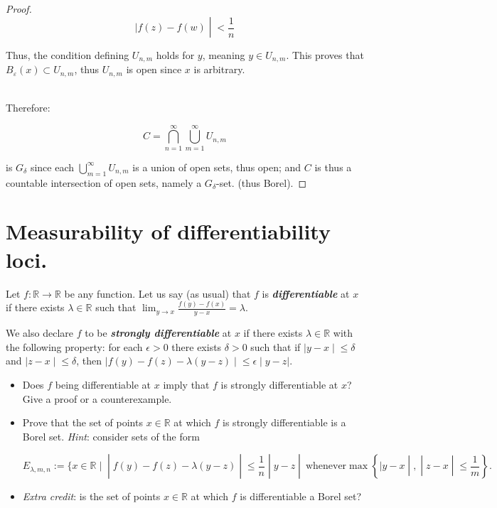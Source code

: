 \documentclass{qlnotes-export}
\begin{document}
\begin{proof}
\[\left. |f(z) - f(w) \middle| < \frac{1}{n} \right.\]

Thus, the condition defining \(U_{n,m}\) holds for \(y\), meaning \(y \in U_{n,m}\). This proves that \(B_{\varepsilon}(x) \subset U_{n,m}\), thus \(U_{n,m}\) is open since \(x\) is arbitrary.\\
\strut \\
Therefore:

\[C = \bigcap\limits_{n = 1}^{\infty}\bigcup\limits_{m = 1}^{\infty}U_{n,m}\]

is \(G_{\delta}\) since each \(\bigcup_{m = 1}^{\infty}U_{n,m}\) is a union of open sets, thus open; and \(C\) is thus a countable intersection of open sets, namely a \(G_{\delta}\)-set. (thus Borel).

\end{proof}

\section{Measurability of differentiability loci.}

Let \(f:{\mathbb{R}}\rightarrow{\mathbb{R}}\) be any function. Let us say (as usual) that \(f\) is \textbf{\emph{differentiable}} at \(x\) if there exists \(\lambda \in {\mathbb{R}}\) such that \(\lim_{y\rightarrow x}\frac{f(y) - f(x)}{y - x} = \lambda\).

We also declare \(f\) to be \textbf{\emph{strongly differentiable}} at \(x\) if there exists \(\lambda \in {\mathbb{R}}\) with the following property: for each \(\epsilon > 0\) there exists \(\delta > 0\) such that if \(\left. |y - x \middle| \leq \delta \right.\) and \(\left. |z - x \middle| \leq \delta \right.\), then \(\left. |f(y) - f(z) - \lambda(y - z) \middle| \leq \epsilon \middle| y - z| \right.\).

\begin{itemize}
\item
  Does \(f\) being differentiable at \(x\) imply that \(f\) is strongly differentiable at \(x\)? Give a proof or a counterexample.
\item
  Prove that the set of points \(x \in {\mathbb{R}}\) at which \(f\) is strongly differentiable is a Borel set. \emph{Hint}: consider sets of the form

  \[\left. E_{\lambda,m,n} := \{ x \in {\mathbb{R}} \mid \middle| f(y) - f(z) - \lambda(y - z) \middle| \leq \frac{1}{n} \middle| y - z \middle| \ \text{whenever}\max\left\{ |y - x \middle| , \middle| z - x \middle| \leq \frac{1}{m} \right\}. \right.\]
\item
  \emph{Extra credit}: is the set of points \(x \in {\mathbb{R}}\) at which \(f\) is differentiable a Borel set?
\end{itemize}
\end{document}
